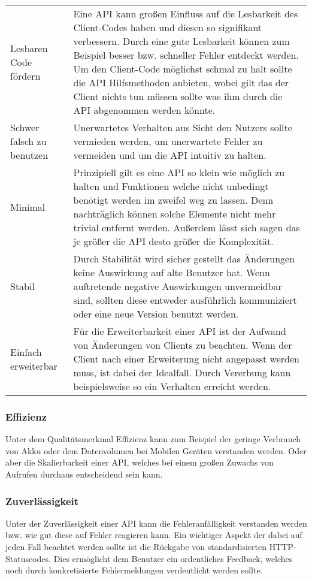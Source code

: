 \begin{table}
\begin{tabu}{|p{0.25\textwidth}|p{0.7\textwidth}|}
		Lesbaren Code fördern & Eine \gls{API} kann großen Einfluss auf die Lesbarkeit des Client-Codes haben und diesen so signifikant verbessern. Durch eine gute Lesbarkeit können zum Beispiel besser bzw. schneller Fehler entdeckt werden. Um den Client-Code möglichst schmal zu halt sollte die \gls{API} Hilfsmethoden anbieten, wobei gilt das der Client nichts tun müssen sollte was ihm durch die \gls{API} abgenommen werden könnte.\\
		Schwer falsch zu benutzen & Unerwartetes Verhalten aus Sicht den Nutzers sollte vermieden werden, um unerwartete Fehler zu vermeiden und um die \gls{API} intuitiv zu halten.\\
		Minimal & Prinzipiell gilt es eine \gls{API} so klein wie möglich zu halten und Funktionen welche nicht unbedingt benötigt werden im zweifel weg zu lassen. Denn nachträglich können solche Elemente nicht mehr trivial entfernt werden. Außerdem lässt sich sagen das je größer die \gls{API} desto größer die Komplexität. \\
		Stabil & Durch Stabilität wird sicher gestellt das Änderungen keine Auswirkung auf alte Benutzer hat. Wenn auftretende negative Auswirkungen unvermeidbar sind, sollten diese entweder ausführlich kommuniziert oder eine neue Version benutzt werden. \\
		Einfach erweiterbar & Für die Erweiterbarkeit einer \gls{API} ist der Aufwand von Änderungen von Clients zu beachten. Wenn der Client nach einer Erweiterung nicht angepasst werden muss, ist dabei der Idealfall. Durch Vererbung kann beispielsweise so ein Verhalten erreicht werden. \\
		\hline
	\end{tabu}
\end{table}

\subsubsection{Effizienz}
Unter dem Qualitätsmerkmal Effizienz kann zum Beispiel der geringe Verbrauch von Akku oder dem Datenvolumen bei Mobilen Geräten verstanden werden. Oder aber die Skalierbarkeit einer \gls{API}, welches bei einem großen Zuwachs von Aufrufen durchaus entscheidend sein kann. \cite[13]{apiDesign}

\subsubsection{Zuverlässigkeit}
Unter der Zuverlässigkeit einer \gls{API} kann die Fehleranfälligkeit verstanden werden bzw. wie gut diese auf Fehler reagieren kann. Ein wichtiger Aspekt der dabei auf jeden Fall beachtet werden sollte ist die Rückgabe von standardisierten HTTP-Statuscodes. Dies ermöglicht dem Benutzer ein ordentliches Feedback, welches noch durch konkretisierte Fehlermeldungen verdeutlicht werden sollte. \cite[13,189]{apiDesign}

